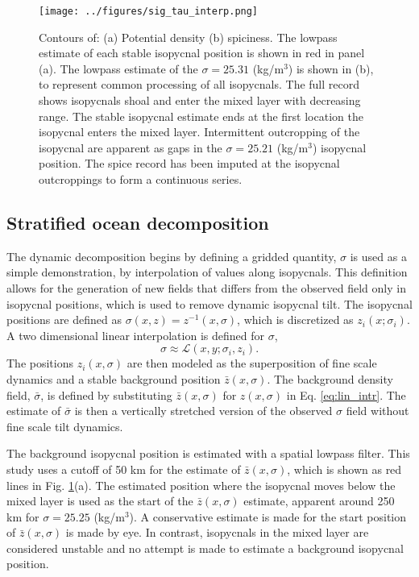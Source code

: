 \documentclass[preprint,NumberedRefs]{JASA}
\begin{document}
\begin{figure}
\texttt{[image: ../figures/sig\_tau\_interp.png]}
    \caption{\label{fig:cntrs}{Contours of: (a) Potential density (b) spiciness. The lowpass estimate of each stable isopycnal position is shown in red in panel (a). The lowpass estimate of the $\sigma=25.31$ (kg/m$^3$) is shown in (b), to represent common processing of all isopycnals. The full record shows isopycnals shoal and enter the mixed layer with decreasing range. The stable isopycnal estimate ends at the first location the isopycnal enters the mixed layer. Intermittent outcropping of the isopycnal are apparent as gaps in the $\sigma=25.21$ (kg/m$^3$) isopycnal position. The spice record has been imputed at the isopycnal outcroppings to form a continuous series.}}
\end{figure}

\subsection{Stratified ocean decomposition}
The dynamic decomposition begins by defining a gridded quantity, $\sigma$ is used as a simple demonstration, by interpolation of values along isopycnals. This definition allows for the generation of new fields that differs from the observed field only in isopycnal positions, which is used to remove dynamic isopycnal tilt. The isopycnal positions are defined as $\sigma(x, z) = z^{-1}(x, \sigma)$, which is discretized as $z_i(x; \sigma_i)$. A two dimensional linear interpolation is defined for $\sigma$,
\begin{equation}
    \sigma\approx\mathcal{L}(x, y; \sigma_i, z_i).
    \label{eq:lin_intr}
\end{equation}
The positions $z_i(x, \sigma)$ are then modeled as the superposition of fine scale dynamics and a stable background position $\bar{z}(x, \sigma)$. The background density field, $\bar{\sigma}$, is defined by substituting $\bar{z}(x, \sigma)$ for $z(x, \sigma)$ in Eq. \eqref{eq:lin_intr}. The estimate of $\bar{\sigma}$ is then a vertically stretched version of the observed $\sigma$ field without fine scale tilt dynamics.

The background isopycnal position is estimated with a spatial lowpass filter. This study uses a cutoff of 50 km for the estimate of $\bar{z}(x, \sigma)$, which is shown as red lines in Fig. \ref{fig:cntrs}(a). The estimated position where the isopycnal moves below the mixed layer is used as the start of the $\bar{z}(x, \sigma)$ estimate, apparent around 250 km for $\sigma=25.25$ (kg/m$^3$). A conservative estimate is made for the start position of $\bar{z}(x, \sigma)$ is made by eye. In contrast, isopycnals in the mixed layer are considered unstable and no attempt is made to estimate a background isopycnal position.
\end{document}
